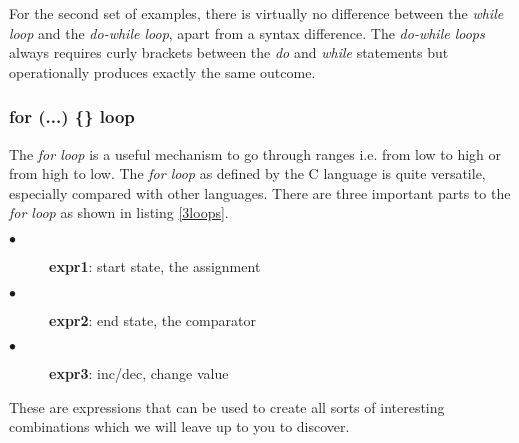 For the second set of examples, there is virtually no difference between the \textit{while loop} and the \textit{do-while loop}, apart from a syntax difference. The \textit{do-while loops} always requires curly brackets between the \textit{do} and \textit{while} statements but operationally produces exactly the same outcome.

\subsubsection{for (...) \{\} loop}


The \textit{for loop} is a useful mechanism to go through ranges i.e. from low to high or from high to low. The \textit{for loop} as defined by the C language is quite versatile, especially compared with other languages. There are three important parts to the \textit{for loop} as shown in listing \ref{3loops}. 

\begin{description}
  \item[$\bullet$] \textbf{expr1}: start state, the assignment 
  \item[$\bullet$] \textbf{expr2}: end state,  the comparator   
  \item[$\bullet$] \textbf{expr3}: inc/dec, change value
\end{description}

These are expressions that can be used to create all sorts of interesting combinations which we will leave up to you to discover. 

